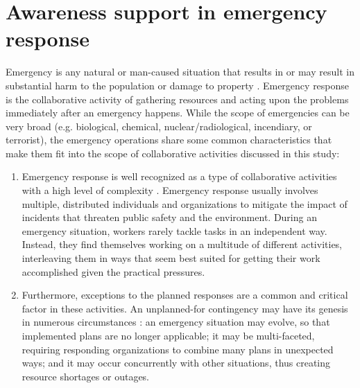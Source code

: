 \section{Awareness support in emergency response} %
\label{sec:awareness_support_in_emergency_response}
Emergency is any natural or man-caused situation that results in or may result in substantial harm to the population or damage to property \cite{shen2004managing}. Emergency response is the collaborative activity of gathering resources and acting upon the problems immediately after an emergency happens. While the scope of emergencies can be very broad (e.g. biological, chemical, nuclear/radiological, incendiary, or terrorist), the emergency operations share some common characteristics that make them fit into the scope of collaborative activities discussed in this study:

\begin{enumerate}
	\item Emergency response is well recognized as a type of collaborative activities with a high level of complexity \cite{Turoff2004}. Emergency response usually involves multiple, distributed individuals and organizations to mitigate the impact of incidents that threaten public safety and the environment. During an emergency situation, workers rarely tackle tasks in an independent way. Instead, they find themselves working on a multitude of different activities, interleaving them in ways that seem best suited for getting their work accomplished given the practical pressures.
	\item Furthermore, exceptions to the planned responses are a common and critical factor in these activities. An unplanned-for contingency may have its genesis in numerous circumstances \cite{Mendonca2004}: an emergency situation may evolve, so that implemented plans are no longer applicable; it may be multi-faceted, requiring responding organizations to combine many plans in unexpected ways; and it may occur concurrently with other situations, thus creating resource shortages or outages.
\end{enumerate}

